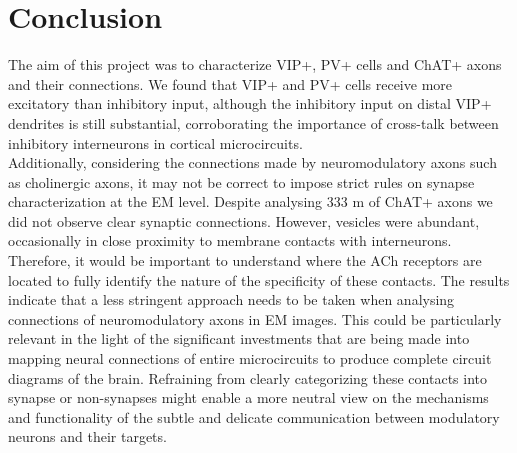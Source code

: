 \section{Conclusion}
The aim of this project was to characterize VIP+, PV+ cells and ChAT+ axons and their connections. We found that VIP+ and PV+ cells receive more excitatory than inhibitory input, although the inhibitory input on distal VIP+ dendrites is still substantial, corroborating the importance of cross-talk between inhibitory interneurons in cortical microcircuits. \\
Additionally, considering the connections made by neuromodulatory axons such as cholinergic axons, it may not be correct to impose strict rules on synapse characterization at the EM level. Despite analysing 333 \textmu m of ChAT+ axons we did not observe clear synaptic connections. However, vesicles were abundant, occasionally in close proximity to membrane contacts with interneurons. Therefore, it would be important to understand where the ACh receptors are located to fully identify the nature of the specificity of these contacts. The results indicate that a less stringent approach needs to be taken when analysing connections of neuromodulatory axons in EM images. This could be particularly relevant in the light of the significant investments that are being made into mapping neural connections of entire microcircuits to produce complete circuit diagrams of the brain. Refraining from clearly categorizing these contacts into synapse or non-synapses might enable a more neutral view on the mechanisms and functionality of the subtle and delicate communication between modulatory neurons and their targets.

